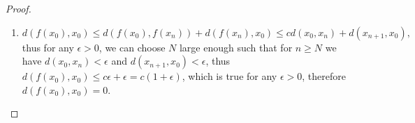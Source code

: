 \documentclass[11pt]{article}
\newtheorem{proof}{Proof}
\begin{document}
\begin{proof}
\begin{enumerate}
\item 
\begin{displaymath}
  d(f(x_0),x_0)\leq d(f(x_0),f(x_n)) + d(f(x_n),x_0)\leq cd(x_0,x_n)+d(x_{n+1},x_0),
\end{displaymath}
thus for any $\epsilon > 0$, we can choose $N$ large enough such that for $n \geq N$ we have $d(x_0, x_n) < \epsilon$ and $d(x_{n+1}, x_0) < \epsilon$, thus $d(f(x_0),x_0)\leq c\epsilon+\epsilon=c(1+\epsilon)$, which is true for any $\epsilon>0$, therefore $d(f(x_0),x_0)=0$.


\end{enumerate}
\end{proof}
\end{document}
